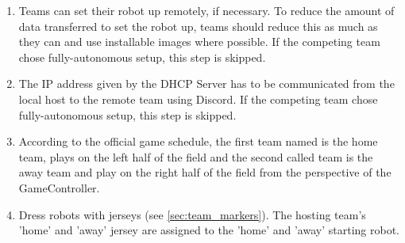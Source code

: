 \begin{enumerate}
        \item Teams can set their robot up remotely, if necessary. To reduce the amount of data transferred to set the robot up, teams should reduce this as much as they can and use installable images where possible. If the competing team chose fully-autonomous setup, this step is skipped.
        \item The IP address given by the DHCP Server has to be communicated from the local host to the remote team using Discord. If the competing team chose fully-autonomous setup, this step is skipped.
        \item According to the official game schedule, the first team named is the home team, plays on the left half of the field and the second called team is the away team and play on the right half of the field from the perspective of the GameController. 
        \item Dress robots with jerseys (see \ref{sec:team_markers}). The hosting team's 'home' and 'away' jersey are assigned to the 'home' and 'away' starting robot. 
    \end{enumerate}

